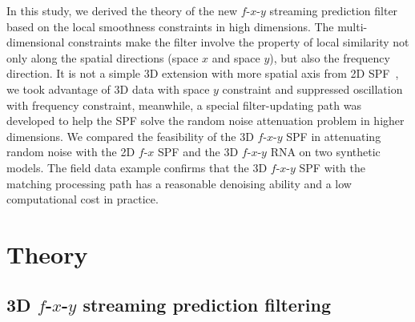 In this study, we derived the theory of the new $f$-$x$-$y$ streaming
prediction filter based on the local smoothness constraints in high
dimensions. The multi-dimensional constraints make the filter involve
the property of local similarity not only along the spatial directions
(space $x$ and space $y$), but also the frequency direction.  It is
not a simple 3D extension with more spatial axis from 2D
SPF~\cite{Guo20}, we took advantage of 3D data with space $y$
constraint and suppressed oscillation with frequency constraint,
meanwhile, a special filter-updating path was developed to help the
SPF solve the random noise attenuation problem in higher
dimensions. We compared the feasibility of the 3D $f$-$x$-$y$ SPF in
attenuating random noise with the 2D $f$-$x$ SPF and the 3D
$f$-$x$-$y$ RNA on two synthetic models. The field data example
confirms that the 3D $f$-$x$-$y$ SPF with the matching processing path
has a reasonable denoising ability and a low computational cost in
practice.

\section{Theory}

\subsection{3D $f$-$x$-$y$ streaming prediction filtering}


